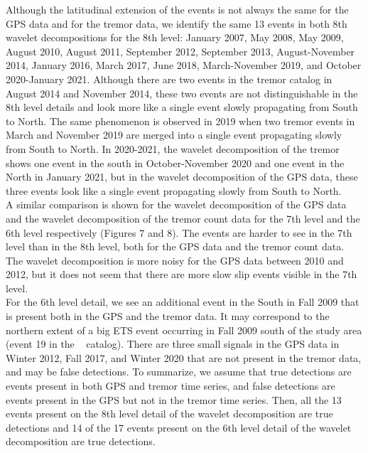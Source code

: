 \documentclass{article}
\begin{document}
Although the latitudinal extension of the events is not always the same for the GPS data and for the tremor data, we identify the same 13 events in both 8th wavelet decompositions for the 8th level: January 2007, May 2008, May 2009, August 2010, August 2011, September 2012, September 2013, August-November 2014, January 2016, March 2017, June 2018, March-November 2019, and October 2020-January 2021. Although there are two events in the tremor catalog in August 2014 and November 2014, these two events are not distinguishable in the 8th level details and look more like a single event slowly propagating from South to North. The same phenomenon is observed in 2019 when two tremor events in March and November 2019 are merged into a single event propagating slowly from South to North. In 2020-2021, the wavelet decomposition of the tremor shows one event in the south in October-November 2020 and one event in the North in January 2021, but in the wavelet decomposition of the GPS data, these three events look like a single event propagating slowly from South to North. \\

A similar comparison is shown for the wavelet decomposition of the GPS data and the wavelet decomposition of the tremor count data for the 7th level and the 6th level respectively (Figures 7 and 8). The events are harder to see in the 7th level than in the 8th level, both for the GPS data and the tremor count data. The wavelet decomposition is more noisy for the GPS data between 2010 and 2012, but it does not seem that there are more slow slip events visible in the 7th level. \\

For the 6th level detail, we see an additional event in the South in Fall 2009 that is present both in the GPS and the tremor data. It may correspond to the northern extent of a big ETS event occurring in Fall 2009 south of the study area (event 19 in the ~\citet{MIC_2019} catalog). There are three small signals in the GPS data in Winter 2012, Fall 2017, and Winter 2020 that are not present in the tremor data, and may be false detections. To summarize, we assume that true detections are events present in both GPS and tremor time series, and false detections are events present in the GPS but not in the tremor time series. Then, all the 13 events present on the 8th level detail of the wavelet decomposition are true detections and 14 of the 17 events present on the 6th level detail of the wavelet decomposition are true detections. \\
\end{document}
